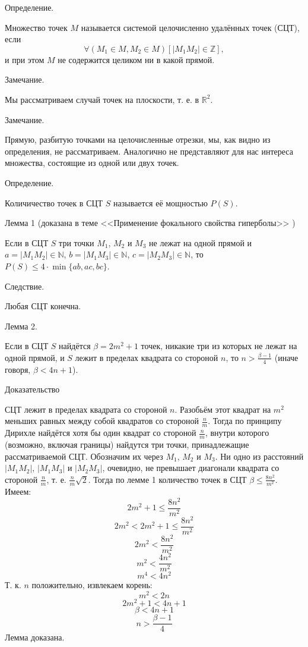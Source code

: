 \documentclass[a4paper,14pt]{article}
\newcommand{\Z}{\mathbb{Z}}
\newcommand{\R}{\mathbb{R}}
\begin{document}
\large

Определение.

Множество точек $M$ называется системой целочисленно удалённых точек (СЦТ), если
$$
\forall(M_1 \in M, M_2\in M)[|M_1 M_2|\in\Z],
$$
и при этом $M$ не содержится целиком ни в какой прямой.

Замечание.

Мы рассматриваем случай точек на плоскости, т. е. в $\R^2$.


Замечание.

Прямую, разбитую точками на целочисленные отрезки, мы, как видно из определения, не рассматриваем.
Аналогично не представляют для нас интереса множества, состоящие из одной или двух точек.

Определение.

Количичество точек в СЦТ $S$ называется её мощностью $P(S)$.

Лемма 1 (доказана в теме <<Применение фокального свойства гиперболы>> \cite{angem1kurs})

Если в СЦТ $S$ три точки $M_1$, $M_2$ и $M_3$ не лежат на одной прямой и 
$a=|M_1 M_2| \in \mathbb{N}$,
$b=|M_1 M_3| \in \mathbb{N}$,
$c=|M_2 M_3| \in \mathbb{N}$,
то 
$P(S) \leq 4\cdot\min\{ab,ac,bc\}$.

Следствие.

Любая СЦТ конечна.

Лемма 2.

Если в СЦТ $S$ найдётся $\beta = 2m^2 +1$ точек, никакие три из которых не лежат на одной прямой, и $S$ лежит в пределах квадрата со стороной $n$, то $n > \frac{\beta - 1}{4}$ (иначе говоря, $ \beta < 4n +1$).

Доказательство

СЦТ лежит в пределах квадрата со стороной $n$. Разобьём этот квадрат на $m^2$ меньших равных между собой квадратов со стороной $\frac{n}{m}$. Тогда по принципу Дирихле найдётся хотя бы один квадрат со стороной $\frac{n}{m}$, внутри которого (возможно, включая границы) найдутся три точки, принадлежащие рассматриваемой СЦТ. Обозначим их через $M_1$, $M_2$ и $M_3$. Ни одно из расстояний $|M_1 M_2|$, $|M_1 M_3|$ и $|M_2 M_3|$, очевидно, не превышает диагонали квадрата со стороной $\frac{n}{m}$, т. е. $\frac{n}{m}\sqrt{2}$. Тогда по лемме 1 количество точек в СЦТ $\beta \le \frac{8n^2}{m^2}$. Имеем:
$$ 2m^2+1 \le \frac{8n^2}{m^2}$$
$$ 2m^2 < 2m^2+1 \le \frac{8n^2}{m^2}$$
$$ 2m^2 < \frac{8n^2}{m^2}$$
$$ m^2 < \frac{4n^2}{m^2}$$
$$ m^4 < 4n^2$$
Т. к. $n$ положительно, извлекаем корень:
$$ m^2 < 2n$$
$$ 2m^2 +1 < 4n +1$$
$$ \beta < 4n +1$$
$$n > \frac{\beta - 1}{4}$$
Лемма доказана.
\end{document}
